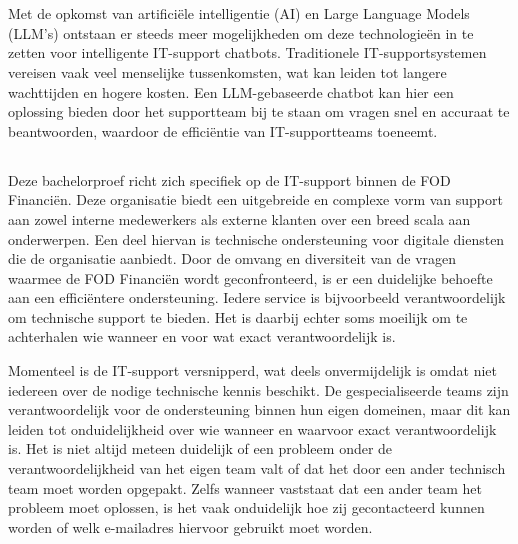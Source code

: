 
\chapter{}%
\label{ch:inleiding}

Met de opkomst van artificiële intelligentie (AI) en Large Language Models (LLM’s) ontstaan er steeds meer mogelijkheden om deze technologieën in te zetten voor intelligente IT-support chatbots. Traditionele IT-supportsystemen vereisen vaak veel menselijke tussenkomsten, wat kan leiden tot langere wachttijden en hogere kosten. Een LLM-gebaseerde chatbot kan hier een oplossing bieden door het supportteam bij te staan om vragen snel en accuraat te beantwoorden, waardoor de efficiëntie van IT-supportteams toeneemt.

\section{}%
\label{sec:probleemstelling}

Deze bachelorproef richt zich specifiek op de IT-support binnen de FOD Financiën. Deze organisatie biedt een uitgebreide en complexe vorm van support aan zowel interne medewerkers als externe klanten over een breed scala aan onderwerpen. Een deel hiervan is technische ondersteuning voor digitale diensten die de organisatie aanbiedt. Door de omvang en diversiteit van de vragen waarmee de FOD Financiën wordt geconfronteerd, is er een duidelijke behoefte aan een efficiëntere ondersteuning. Iedere service is bijvoorbeeld verantwoordelijk om technische support te bieden. Het is daarbij echter soms moeilijk om te achterhalen wie wanneer en voor wat exact verantwoordelijk is. 

Momenteel is de IT-support versnipperd, wat deels onvermijdelijk is omdat niet iedereen over de nodige technische kennis beschikt. De gespecialiseerde teams zijn verantwoordelijk voor de ondersteuning binnen hun eigen domeinen, maar dit kan leiden tot onduidelijkheid over wie wanneer en waarvoor exact verantwoordelijk is. Het is niet altijd meteen duidelijk of een probleem onder de verantwoordelijkheid van het eigen team valt of dat het door een ander technisch team moet worden opgepakt. Zelfs wanneer vaststaat dat een ander team het probleem moet oplossen, is het vaak onduidelijk hoe zij gecontacteerd kunnen worden of welk e-mailadres hiervoor gebruikt moet worden.

